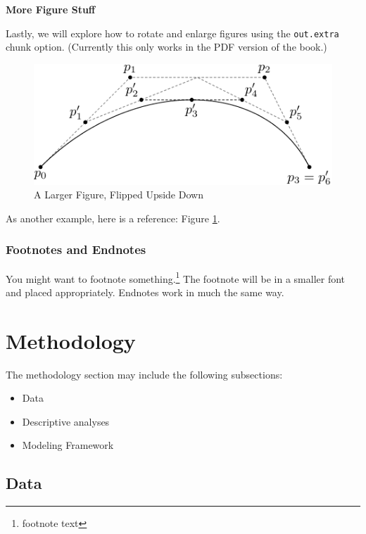 \documentclass[12pt,oneside]{chicagocapstone}
\providecommand{\tightlist}{%
  \setlength{\itemsep}{0pt}\setlength{\parskip}{0pt}}
\begin{document}
\textbf{More Figure Stuff}

Lastly, we will explore how to rotate and enlarge figures using the \texttt{out.extra} chunk option. (Currently this only works in the PDF version of the book.)
\begin{figure}
\includegraphics[angle=180, scale=1.1]{figure/subdivision} \caption{A Larger Figure, Flipped Upside Down}\label{fig:subd2}
\end{figure}
As another example, here is a reference: Figure \ref{fig:subd2}.

\hypertarget{footnotes-and-endnotes}{%
\subsection*{Footnotes and Endnotes}\label{footnotes-and-endnotes}}

You might want to footnote something.\footnote{footnote text} The footnote will be in a smaller font and placed appropriately. Endnotes work in much the same way.

\hypertarget{methodology}{%
\chapter*{Methodology}\label{methodology}}

The methodology section may include the following subsections:
\begin{itemize}
\tightlist
\item
  Data
\item
  Descriptive analyses
\item
  Modeling Framework
\end{itemize}
\hypertarget{methodology-data}{%
\section*{Data}\label{methodology-data}}
\end{document}
